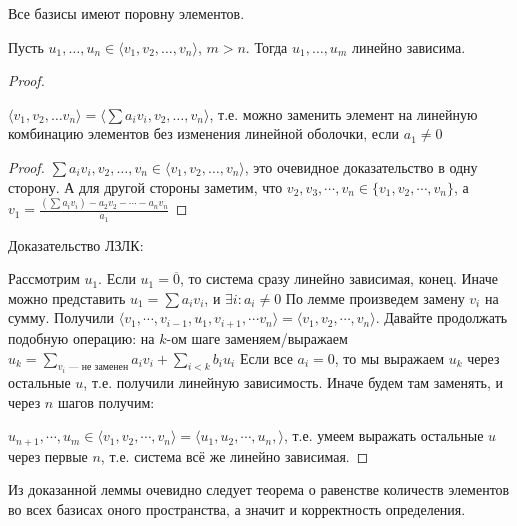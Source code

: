 \begin{theorem}
    Все базисы имеют поровну элементов.
\end{theorem}
\begin{lemma}
    Пусть $u_1, \ldots, u_n \in \langle v_1, v_2, \ldots, v_n \rangle$, $m > n$. Тогда  $u_1, \ldots, u_m$ линейно зависима.
\end{lemma}
\begin{proof}
	\begin{lemma}[О замене]
		$\langle v_1, v_2, \ldots v_n \rangle = \langle \sum a_i v_i, v_2, \ldots, v_n \rangle$, т.е. можно заменить элемент на линейную комбинацию элементов без изменения линейной оболочки, если $a_1 \neq 0$
    \end{lemma}
    \begin{proof}
	    $\sum a_i v_i, v_2, \ldots, v_n \in \langle v_1, v_2, \ldots, v_n \rangle$, это очевидное доказательство в одну сторону. А для другой стороны заметим, что $v_2, v_3, \cdots, v_n \in \lbrace v_1, v_2, \cdots, v_n \rbrace$, а $v_1 = \frac{(\sum a_i v_i) - a_2 v_2 - \cdots - a_n v_n}{a_1}$
    \end{proof}
    
    Доказательство ЛЗЛК:

    Рассмотрим $u_1$. Если $u_1 = \overline{0}$, то система сразу линейно зависимая, конец. Иначе можно представить $u_1 = \sum a_i v_i$, и $\exists i : a_i \neq 0$ По лемме произведем замену $v_i$ на сумму. Получили $\langle v_1, \cdots, v_{i-1}, u_1, v_{i+1}, \cdots v_n \rangle = \langle v_1, v_2, \cdots, v_n \rangle$. Давайте продолжать подобную операцию: на $k$-ом шаге заменяем/выражаем $u_k = \sum_{v_i \text{ --- не заменен}} a_i v_i + \sum_{i < k} b_i u_i$ Если все $a_i = 0$, то мы выражаем $u_k$ через остальные $u$, т.е. получили линейную зависимость. Иначе будем там заменять, и через $n$ шагов получим:

    $u_{n+1}, \cdots, u_m \in \langle v_1, v_2, \cdots, v_n \rangle = \langle u_1, u_2, \cdots, u_n, \rangle$, т.е. умеем выражать остальные $u$ через первые $n$, т.е. система всё же линейно зависимая.
\end{proof}

Из доказанной леммы очевидно следует теорема о равенстве количеств элементов во всех базисах оного пространства, а значит и корректность определения.


